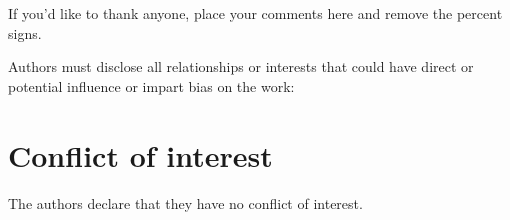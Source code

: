 

\begin{acknowledgements}
If you'd like to thank anyone, place your comments here and remove the percent signs.
\end{acknowledgements}


Authors must disclose all relationships or interests that could have direct or potential influence or impart bias on
 the work:

\section*{Conflict of interest}

The authors declare that they have no conflict of interest.

